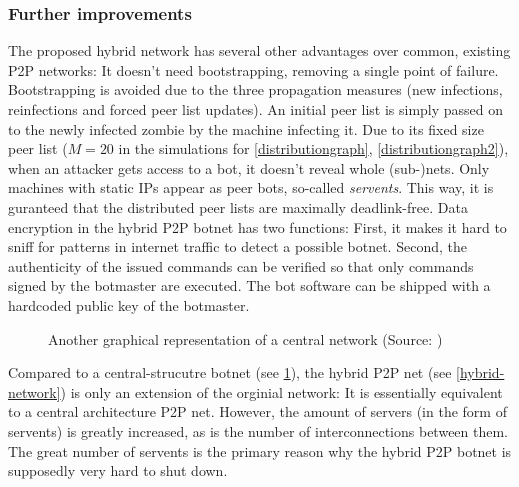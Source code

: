 \documentclass{llncs}
\begin{document}
\subsubsection{Further improvements}

The proposed hybrid network has several other advantages over common,
existing P2P networks: It doesn't need bootstrapping, removing a
single point of failure. Bootstrapping is avoided due to the three
propagation measures (new infections, reinfections and forced peer
list updates). An initial peer list is simply passed on to the newly
infected zombie by the machine infecting it. Due to its fixed size
peer list ($M=20$ in the simulations for \ref{distributiongraph},
\ref{distributiongraph2}), when an attacker gets access to a bot, it
doesn't reveal whole (sub-)nets.  Only machines with static IPs appear
as peer bots, so-called {\it servents}. This way, it is guranteed that
the distributed peer lists are maximally deadlink-free. Data
encryption in the hybrid P2P botnet has two functions: First, it makes
it hard to sniff for patterns in internet traffic to detect a possible
botnet. Second, the authenticity of the issued commands can be
verified so that only commands signed by the botmaster are
executed. The bot software can be shipped with a hardcoded public key
of the botmaster.

\begin{figure}[htbp]
  \centering
  \caption{Another graphical representation of a central network (Source: \cite{td1sc})}
  \label{central-network2}
\end{figure}

Compared to a central-strucutre botnet (see \ref{central-network2}),
the hybrid P2P net (see \ref{hybrid-network}) is only an extension of the
orginial network: It is essentially equivalent to a central
architecture P2P net. However, the amount of servers (in the form of
servents) is greatly increased, as is the number of interconnections
between them. The great number of servents is the primary reason why
the hybrid P2P botnet is supposedly very hard to shut
down.\cite{td1sc}
\end{document}
